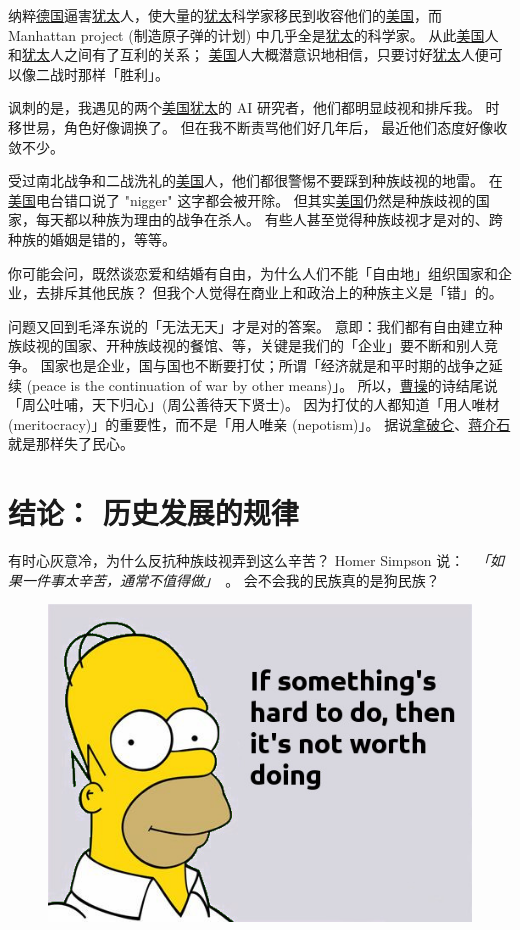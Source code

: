 \documentclass[12pt]{report}
\newcommand{\speechCn}[1]{\textit{\textcolor{Speech}{\ 「#1」\ }}}
\begin{document}
{纳粹\uline{德国}逼害\uline{犹太}人，使大量的\uline{犹太}科学家移民到收容他们的\uline{美国}，而 Manhattan project (制造原子弹的计划) 中几乎全是\uline{犹太}的科学家。 从此\uline{美国}人和\uline{犹太}人之间有了互利的关系； \uline{美国}人大概潜意识地相信，只要讨好\uline{犹太}人便可以像二战时那样「胜利」。

讽刺的是，我遇见的两个\uline{美国}\uline{犹太}的 AI 研究者，他们都明显歧视和排斥我。 时移世易，角色好像调换了。 但在我不断责骂他们好几年后， 最近他们态度好像收敛不少。

受过南北战争和二战洗礼的\uline{美国}人，他们都很警惕不要踩到种族歧视的地雷。 在\uline{美国}电台错口说了 "nigger" 这字都会被开除。 但其实\uline{美国}仍然是种族歧视的国家，每天都以种族为理由的战争在杀人。 有些人甚至觉得种族歧视才是对的、跨种族的婚姻是错的，等等。

你可能会问，既然谈恋爱和结婚有自由，为什么人们不能「自由地」组织国家和企业，去排斥其他民族？ 但我个人觉得在商业上和政治上的种族主义是「错」的。

问题又回到毛泽东说的「无法无天」才是对的答案。 意即：我们都有自由建立种族歧视的国家、开种族歧视的餐馆、等，关键是我们的「企业」要不断和别人竞争。 国家也是企业，国与国也不断要打仗；所谓「经济就是和平时期的战争之延续 (peace is the continuation of war by other means)」。 所以，\uline{曹操}的诗结尾说「周公吐哺，天下归心」(周公善待天下贤士)。 因为打仗的人都知道「用人唯材 (meritocracy)」的重要性，而不是「用人唯亲 (nepotism)」。 据说\uline{拿破仑}、\uline{蒋介石}就是那样失了民心。

\chapter{结论： 历史发展的规律}

有时心灰意冷，为什么反抗种族歧视弄到这么辛苦？ Homer Simpson 说： \speechCn{如果一件事太辛苦，通常不值得做}。 会不会我的民族真的是狗民族？ %
\begin{figure}[H]
\centering
\includegraphics[scale=0.5]{homer-simpson.jpg}
\end{figure}

}
\end{document}
